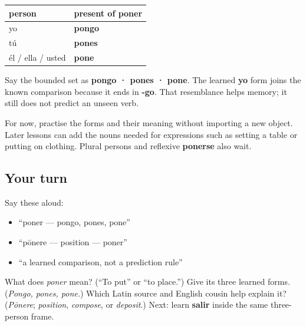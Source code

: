 \begin{grammarlens}[title={Grammar Lens: only the three singular forms}]
\noindent
\begin{tabularx}{\linewidth}{@{}>{\raggedright\arraybackslash}X>{\raggedright\arraybackslash}X@{}}
\toprule
\textbf{person} & \textbf{present of \textbf{poner}} \\
\midrule
yo & \textbf{pongo} \\
tú & \textbf{pones} \\
él / ella / usted & \textbf{pone} \\
\bottomrule
\end{tabularx}

Say the bounded set as \textbf{pongo · pones · pone}. The learned \textbf{yo} form joins the known comparison because it ends in \textbf{-go}. That resemblance helps memory; it still does not predict an unseen verb.

For now, practise the forms and their meaning without importing a new object. Later lessons can add the nouns needed for expressions such as setting a table or putting on clothing. Plural persons and reflexive \textbf{ponerse} also wait.
\end{grammarlens}

\subsection*{Your turn}
Say these aloud:

\begin{itemize}
\raggedright
  \item “poner — pongo, pones, pone”
  \item “pōnere — position — poner”
  \item “a learned comparison, not a prediction rule”
\end{itemize}

\begin{tcolorbox}[breakable,colback=teal!4,colframe=teal!35!black,title={Before you move on}]
What does \emph{poner} mean? (“To put” or “to place.”) Give its three learned forms. (\emph{Pongo, pones, pone.}) Which Latin source and English cousin help explain it? (\emph{Pōnere}; \emph{position}, \emph{compose}, or \emph{deposit}.) Next: learn \textbf{salir} inside the same three-person frame.
\end{tcolorbox}
